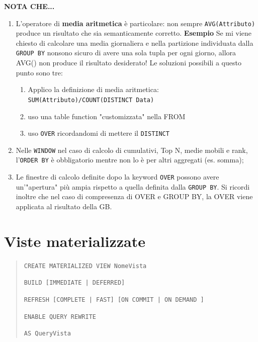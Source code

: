 \documentclass[12pt]{article}
\begin{document}
\textbf{NOTA CHE...}
\begin{enumerate}
    \item L'operatore di \textbf{media aritmetica} è particolare: non sempre \texttt{AVG(Attributo)} produce un risultato che sia semanticamente corretto. 
    \textbf{Esempio} Se mi viene chiesto di calcolare una media giornaliera e nella partizione individuata dalla \texttt{GROUP BY} nonsono sicuro di avere una sola tupla per ogni giorno, allora AVG() non produce il risultato desiderato! Le soluzioni possibili a questo punto sono tre:
    \begin{enumerate}
        \item Applico la definizione di media aritmetica: \texttt{SUM(Attributo)/COUNT(DISTINCT Data)}
        \item uso una table function "customizzata" nella FROM
        \item uso \texttt{OVER} ricordandomi di mettere il \texttt{DISTINCT}
    \end{enumerate}
    \item Nelle \texttt{WINDOW} nel caso di calcolo di cumulativi, Top N, medie mobili e rank, l'\texttt{ORDER BY} è obbligatorio mentre non lo è per altri aggregati (es. somma);
    \item Le finestre di calcolo definite dopo la keyword \texttt{OVER} possono avere un'"apertura" più ampia rispetto a quella definita dalla \texttt{GROUP BY}. Si ricordi inoltre che nel caso di compresenza di OVER e GROUP BY, la OVER viene applicata al risultato della GB.
\end{enumerate}

\section{Viste materializzate}
\begin{quote}
    \texttt{CREATE MATERIALIZED VIEW NomeVista}

    \texttt{BUILD [IMMEDIATE | DEFERRED]}

    \texttt{REFRESH [COMPLETE | FAST] [ON COMMIT | ON DEMAND ]}

    \texttt{ENABLE QUERY REWRITE}

    \texttt{AS QueryVista}
\end{quote}
\end{document}
